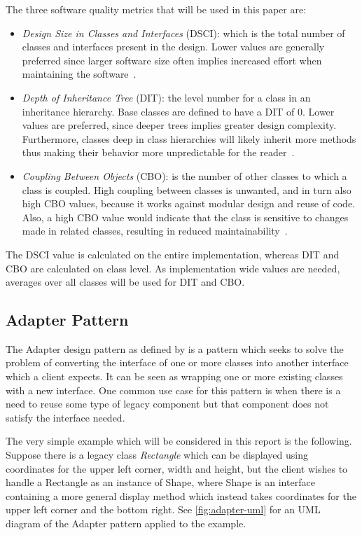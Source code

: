 \documentclass[conference]{IEEEtran}
\begin{document}
The three software quality metrics that will be used in this paper are:
\begin{itemize}
    \item
        \emph{Design Size in Classes and Interfaces} (DSCI): which is the total number of classes and interfaces present in the design.
        Lower values are generally preferred since larger software size often implies increased effort when maintaining the software~\cite{riaz2009:systematic}.
    \item
        \emph{Depth of Inheritance Tree} (DIT): the level number for a class in an inheritance hierarchy.
        Base classes are defined to have a DIT of 0.
        Lower values are preferred, since deeper trees implies greater design complexity.
        Furthermore, classes deep in class hierarchies will likely inherit more methods thus making their behavior more unpredictable for the reader~\cite{kemerer:metrics}.
    \item
        \emph{Coupling Between Objects} (CBO): is the number of other classes to which a class is coupled.
        High coupling between classes is unwanted, and in turn also high CBO values, because it works against modular design and reuse of code.
        Also, a high CBO value would indicate that the class is sensitive to changes made in related classes, resulting in reduced maintainability~\cite{kemerer:metrics}.

\end{itemize}

The DSCI value is calculated on the entire implementation, whereas DIT and CBO are calculated on class level.
As implementation wide values are needed, averages over all classes will be used for DIT and CBO.

\subsection{Adapter Pattern}
\label{sub:adapter_pattern}
The Adapter design pattern as defined by \citet{gamma1993:gof} is a pattern which seeks to solve the problem of converting the interface of one or more classes into another interface which a client expects.
It can be seen as wrapping one or more existing classes with a new interface.
One common use case for this pattern is when there is a need to reuse some type of legacy component but that component does not satisfy the interface needed.

The very simple example which will be considered in this report is the following.
Suppose there is a legacy class \emph{Rectangle} which can be displayed using coordinates for the upper left corner, width and height, but the client wishes to handle a Rectangle as an instance of Shape, where Shape is an interface containing a more general display method which instead takes coordinates for the upper left corner and the bottom right.
See \autoref{fig:adapter-uml} for an UML diagram of the Adapter pattern applied to the example.
\end{document}
